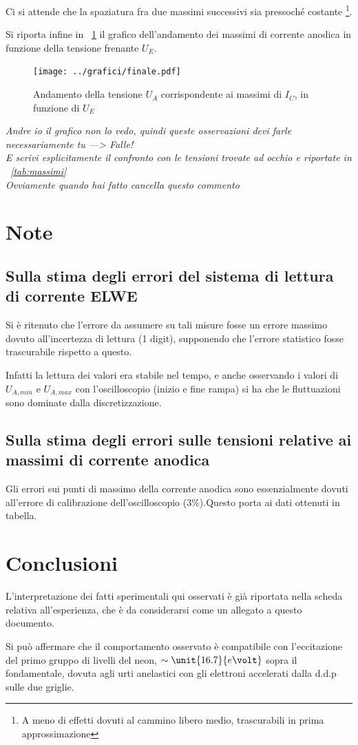 \documentclass[10pt,a4paper]{article}
\begin{document}
Ci si attende che la spaziatura fra due massimi successivi sia pressoché costante \footnote{A meno di effetti dovuti al cammino libero medio, trascurabili in prima approssimazione}.


Si riporta infine in \figurename{~\ref{fig:final}} il grafico dell'andamento dei massimi di corrente anodica in funzione della tensione frenante $U_E$.

\begin{figure}[h!]
	\centering
	\texttt{[image: ../grafici/finale.pdf]}
	\caption{Andamento della tensione $U_A$ corrispondente ai massimi di $I_C$, in funzione di $U_E$}
	\label{fig:final}
\end{figure}

\emph{\LARGE Andre io il grafico non lo vedo, quindi queste osservazioni devi farle necessariamente tu ---> Falle! \\	
E scrivi esplicitamente il confronto con le tensioni trovate ad occhio e riportate in \tablename{~\ref{tab:massimi}} \\
Ovviamente quando hai fatto cancella questo commento}

\section{Note}

\subsection{Sulla stima degli errori del sistema di lettura di corrente ELWE}
\label{errELWE}
Si è ritenuto che l'errore da assumere su tali misure fosse un errore massimo dovuto all'incertezza di lettura (1 digit), supponendo che l'errore statistico fosse trascurabile rispetto a questo.

Infatti la lettura dei valori era stabile nel tempo, e anche osservando i valori di $U_{A, min}$ e $U_{A, max}$ con l'oscilloscopio (inizio e fine rampa) si ha che le fluttuazioni sono dominate dalla discretizzazione.

\subsection{Sulla stima degli errori sulle tensioni relative ai massimi di corrente anodica}

Gli errori sui punti di massimo della corrente anodica sono essenzialmente dovuti all'errore di calibrazione dell'oscilloscopio (3\%).Questo porta ai dati ottenuti in tabella. 

\section{Conclusioni}
L'interpretazione dei fatti sperimentali qui osservati è già riportata nella scheda relativa all'esperienza, che è da considerarsi come un allegato a questo documento.

Si può affermare che il comportamento osservato è compatibile con l'eccitazione del primo gruppo di livelli del neon, $\sim \unit{16.7}{e\volt}$ sopra il fondamentale, dovuta agli urti anelastici con gli elettroni accelerati dalla d.d.p sulle due griglie.
\end{document}
